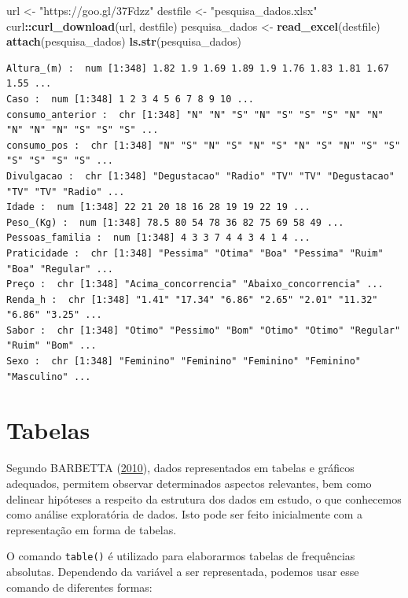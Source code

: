 \documentclass[12pt,brazil,oneside]{book}
\newenvironment{Shaded}{\begin{snugshade}}{\end{snugshade}}
\newcommand{\KeywordTok}[1]{\textcolor[rgb]{0.13,0.29,0.53}{\textbf{#1}}}
\newcommand{\NormalTok}[1]{#1}
\newcommand{\OperatorTok}[1]{\textcolor[rgb]{0.81,0.36,0.00}{\textbf{#1}}}
\newcommand{\StringTok}[1]{\textcolor[rgb]{0.31,0.60,0.02}{#1}}
\begin{document}
\begin{Shaded}
\begin{Highlighting}[]
\NormalTok{url <-}\StringTok{ "https://goo.gl/37Fdzz"}
\NormalTok{destfile <-}\StringTok{ "pesquisa_dados.xlsx"}
\NormalTok{curl}\OperatorTok{::}\KeywordTok{curl_download}\NormalTok{(url, destfile)}
\NormalTok{pesquisa_dados <-}\StringTok{ }\KeywordTok{read_excel}\NormalTok{(destfile)}
\KeywordTok{attach}\NormalTok{(pesquisa_dados)}
\KeywordTok{ls.str}\NormalTok{(pesquisa_dados)}
\end{Highlighting}
\end{Shaded}

\begin{verbatim}
Altura_(m) :  num [1:348] 1.82 1.9 1.69 1.89 1.9 1.76 1.83 1.81 1.67 1.55 ...
Caso :  num [1:348] 1 2 3 4 5 6 7 8 9 10 ...
consumo_anterior :  chr [1:348] "N" "N" "S" "N" "S" "S" "S" "N" "N" "N" "N" "N" "S" "S" "S" ...
consumo_pos :  chr [1:348] "N" "S" "N" "S" "N" "S" "N" "S" "N" "S" "S" "S" "S" "S" "S" ...
Divulgacao :  chr [1:348] "Degustacao" "Radio" "TV" "TV" "Degustacao" "TV" "TV" "Radio" ...
Idade :  num [1:348] 22 21 20 18 16 28 19 19 22 19 ...
Peso_(Kg) :  num [1:348] 78.5 80 54 78 36 82 75 69 58 49 ...
Pessoas_familia :  num [1:348] 4 3 3 7 4 4 3 4 1 4 ...
Praticidade :  chr [1:348] "Pessima" "Otima" "Boa" "Pessima" "Ruim" "Boa" "Regular" ...
Preço :  chr [1:348] "Acima_concorrencia" "Abaixo_concorrencia" ...
Renda_h :  chr [1:348] "1.41" "17.34" "6.86" "2.65" "2.01" "11.32" "6.86" "3.25" ...
Sabor :  chr [1:348] "Otimo" "Pessimo" "Bom" "Otimo" "Otimo" "Regular" "Ruim" "Bom" ...
Sexo :  chr [1:348] "Feminino" "Feminino" "Feminino" "Feminino" "Masculino" ...
\end{verbatim}

\hypertarget{tabelas}{%
\section{Tabelas}\label{tabelas}}

Segundo BARBETTA (\protect\hyperlink{ref-barbetta1988}{2010}), dados
representados em tabelas e gráficos adequados, permitem observar
determinados aspectos relevantes, bem como delinear hipóteses a respeito
da estrutura dos dados em estudo, o que conhecemos como análise
exploratória de dados. Isto pode ser feito inicialmente com a
representação em forma de tabelas.

O comando \texttt{table()} é utilizado para elaborarmos tabelas de
frequências absolutas. Dependendo da variável a ser representada,
podemos usar esse comando de diferentes formas:
\end{document}
